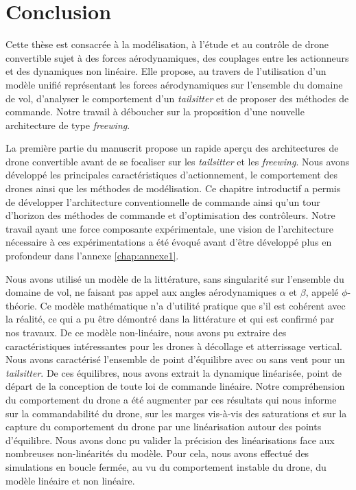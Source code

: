 \chapter*{Conclusion}

{ \color{red}

Cette thèse est consacrée à la modélisation, à l'étude et au contrôle de drone convertible sujet à des forces aérodynamiques, des couplages entre les actionneurs et des dynamiques non linéaire. Elle propose, au travers de l'utilisation d'un modèle unifié représentant les forces aérodynamiques sur l'ensemble du domaine de vol, d'analyser le comportement d'un \textit{tailsitter} et de proposer des méthodes de commande. Notre travail à déboucher sur la proposition d'une nouvelle architecture de type \textit{freewing}.

La première partie du manuscrit propose un rapide aperçu des architectures de drone convertible avant de se focaliser sur les \textit{tailsitter} et les \textit{freewing}. Nous avons développé les principales caractéristiques d'actionnement, le comportement des drones ainsi que les méthodes de modélisation. Ce chapitre introductif a permis de développer l'architecture conventionnelle de commande ainsi qu'un tour d'horizon des méthodes de commande et d'optimisation des contrôleurs. Notre travail ayant une force composante expérimentale, une vision de l'architecture nécessaire à ces expérimentations a été évoqué avant d'être développé plus en profondeur dans l'annexe \ref{chap:annexe1}.  

Nous avons utilisé un modèle de la littérature, sans singularité sur l'ensemble du domaine de vol, ne faisant pas appel aux angles aérodynamiques $\alpha$ et $\beta$, appelé $\phi$-théorie. Ce modèle mathématique n'a d'utilité pratique que s'il est cohérent avec la réalité, ce qui a pu être démontré dans la littérature et qui est confirmé par nos travaux. De ce modèle non-linéaire, nous avons pu extraire des caractéristiques intéressantes pour les drones à décollage et atterrissage vertical. 
Nous avons caractérisé l'ensemble de point d'équilibre avec ou sans vent pour un \textit{tailsitter}. De ces équilibres, nous avons extrait la dynamique linéarisée, point de départ de la conception de toute loi de commande linéaire. Notre compréhension du comportement du drone a été augmenter par ces résultats qui nous informe sur la commandabilité du drone, sur les marges vis-à-vis des saturations et sur la capture du comportement du drone par une linéarisation autour des points d'équilibre. Nous avons donc pu valider la précision des linéarisations face aux nombreuses non-linéarités du modèle. Pour cela, nous avons effectué des simulations en boucle fermée, au vu du comportement instable du drone, du modèle linéaire et non linéaire.

}
